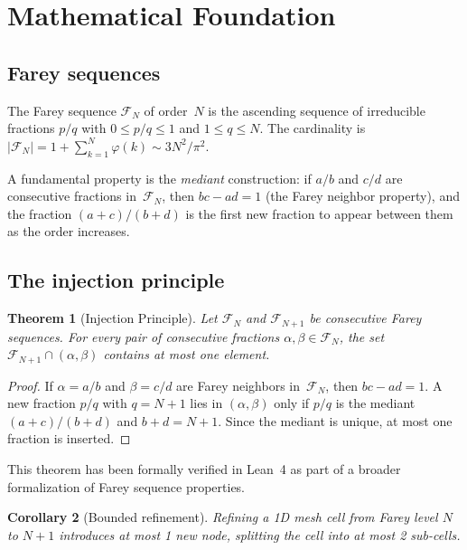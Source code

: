 \documentclass[11pt]{article}
\newtheorem{theorem}{Theorem}[section]
\newtheorem{corollary}[theorem]{Corollary}
\theoremstyle{definition}
\newcommand{\F}{\mathcal{F}}
\begin{document}
\section{Mathematical Foundation}\label{sec:foundation}

\subsection{Farey sequences}

The Farey sequence $\F_N$ of order~$N$ is the ascending sequence of
irreducible fractions $p/q$ with $0 \le p/q \le 1$ and
$1 \le q \le N$. The cardinality is
$|\F_N| = 1 + \sum_{k=1}^{N} \varphi(k) \sim 3N^2/\pi^2$.

A fundamental property is the \emph{mediant} construction: if $a/b$
and $c/d$ are consecutive fractions in~$\F_N$, then $bc - ad = 1$
(the Farey neighbor property), and the fraction $(a+c)/(b+d)$ is the
first new fraction to appear between them as the order increases.

\subsection{The injection principle}

\begin{theorem}[Injection Principle]\label{thm:injection}
Let $\F_N$ and $\F_{N+1}$ be consecutive Farey sequences. For every
pair of consecutive fractions $\alpha, \beta \in \F_N$, the set
$\F_{N+1} \cap (\alpha, \beta)$ contains at most one element.
\end{theorem}

\begin{proof}
If $\alpha = a/b$ and $\beta = c/d$ are Farey neighbors in~$\F_N$,
then $bc - ad = 1$. A new fraction $p/q$ with $q = N+1$ lies in
$(\alpha, \beta)$ only if $p/q$ is the mediant $(a+c)/(b+d)$ and
$b+d = N+1$. Since the mediant is unique, at most one fraction is
inserted.
\end{proof}

This theorem has been formally verified in Lean~4 as part of a
broader formalization of Farey sequence properties.

\begin{corollary}[Bounded refinement]
Refining a 1D mesh cell from Farey level $N$ to $N+1$ introduces at
most 1 new node, splitting the cell into at most 2 sub-cells.
\end{corollary}
\end{document}
